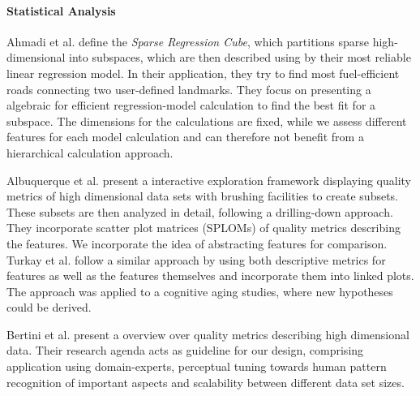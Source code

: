 \documentclass[journal]{style/vgtc} 			          %
\newcommand{\com}[1]{\textcolor{orange}{\uline{#1}}}
\begin{document}
\paragraph{Statistical Analysis}

Ahmadi et al. \cite{Ahmadi} define the \emph{Sparse Regression Cube}, which partitions sparse high-dimensional into subspaces, which are then described using by their most reliable linear regression model.
In their application, they try to find most fuel-efficient roads connecting two user-defined landmarks.
They focus on presenting a algebraic for efficient regression-model calculation to find the best fit for a subspace.
The dimensions for the calculations are fixed, while we assess different features for each model calculation and can therefore not benefit from a hierarchical calculation approach.

Albuquerque et al. \cite{Albuquerque} present a interactive exploration framework displaying quality metrics of high dimensional data sets with brushing facilities to create subsets.
These subsets are then analyzed in detail, following a drilling-down approach.
They incorporate scatter plot matrices (SPLOMs) of quality metrics describing the features.
We incorporate the idea of abstracting features for comparison.
Turkay et al. \cite{Turkay} follow a similar approach by using both descriptive metrics for features as well as the features themselves and incorporate them into linked plots.
The approach was applied to a cognitive aging studies, where new hypotheses could be derived.

Bertini et al. \cite{Bertini} present a overview over quality metrics describing high dimensional data.
Their research agenda acts as guideline for our design, comprising application using domain-experts, perceptual tuning towards human pattern recognition of important aspects and scalability between different data set sizes.
\end{document}
